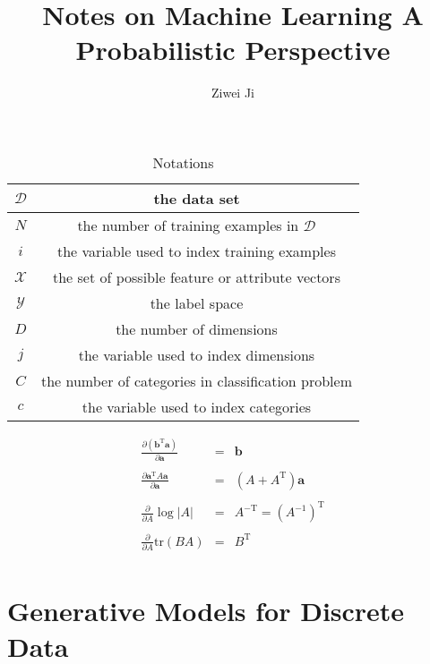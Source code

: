 \documentclass[openany]{book}
\author{Ziwei Ji}
\title{Notes on Machine Learning A Probabilistic Perspective}
\begin{document}
\maketitle

\begin{table}
\begin{tabular}{|c|c|}
\hline
$\mathcal{D}$ & the data set \\
\hline
$N$ & the number of training examples in $\mathcal{D}$ \\
\hline
$i$ & the variable used to index training examples \\
\hline
$\mathcal{X}$ & the set of possible feature or attribute vectors \\
\hline
$\mathcal{Y}$ & the label space \\
\hline
$D$ & the number of dimensions \\
\hline
$j$ & the variable used to index dimensions \\
\hline
$C$ & the number of categories in classification problem \\
\hline
$c$ & the variable used to index categories \\
\hline
\end{tabular}
\caption{Notations}
\end{table}

\begin{equation*}
\begin{array}{rcl}
\displaystyle\frac{\partial(\mathbf{b}^{\mathrm{T}}\mathbf{a})}{\partial\mathbf{a}} & = & \mathbf{b} \\
 & & \\
\displaystyle\frac{\partial \mathbf{a}^{\mathrm{T}}A\mathbf{a}}{\partial\mathbf{a}} & = & (A+A^{\mathrm{T}})\mathbf{a} \\
 & & \\
\displaystyle\frac{\partial}{\partial A}\log|A| & = & A^{-\mathrm{T}}=(A^{-1})^{\mathrm{T}} \\
 & & \\
\displaystyle\frac{\partial}{\partial A}\mathrm{tr}(BA) & = & B^{\mathrm{T}} \\
\end{array}
\end{equation*}

\setcounter{chapter}{2}

\chapter{Generative Models for Discrete Data}
\end{document}
